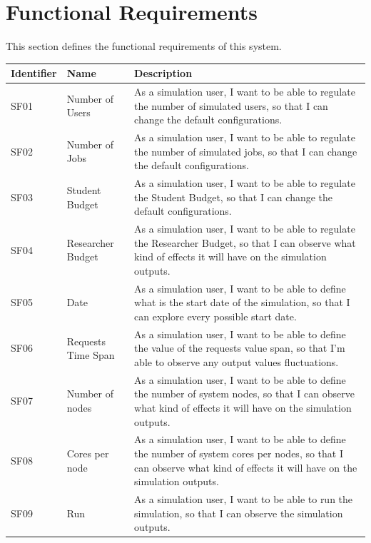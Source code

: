 \documentclass{scrreprt}
\begin{document}
\chapter{Functional Requirements}
This section defines the functional requirements of this system.
\begin{center}
    \begin{longtable}{|M{1.5cm}|M{4cm}|M{8cm}|}
        \hline
	    Identifier & Name & Description\\
        \hline
        SF01 & Number of Users & As a simulation user, I want to be able to regulate the number of simulated users, so that I can change the default configurations.  \\
        \hline
        SF02 & Number of Jobs & As a simulation user, I want to be able to regulate the number of simulated jobs, so that I can change the default configurations.  \\
        \hline
        SF03 & Student Budget & As a simulation user, I want to be able to regulate the Student Budget, so that I can change the default configurations.  \\
        \hline
        SF04 & Researcher Budget & As a simulation user, I want to be able to regulate the Researcher Budget, so that I can observe what kind of effects it will have on the simulation outputs.  \\
        \hline
        SF05 & Date & As a simulation user, I want to be able to define what is the start date of the simulation, so that I can explore every possible start date.  \\
        \hline
        SF06 & Requests Time Span & As a simulation user, I want to be able to define the value of the requests value span, so that I'm able to observe any output values fluctuations.  \\
        \hline
        SF07 & Number of nodes & As a simulation user, I want to be able to define the number of system nodes, so that I can observe what kind of effects it will have on the simulation outputs.   \\
        \hline
        SF08 & Cores per node & As a simulation user, I want to be able to define the number of system cores per nodes, so that I can observe what kind of effects it will have on the simulation outputs.   \\
        \hline
        SF09 & Run & As a simulation user, I want to be able to run the simulation, so that I can observe the simulation outputs.   \\
        \hline
    \end{longtable}
\end{center}
\end{document}
